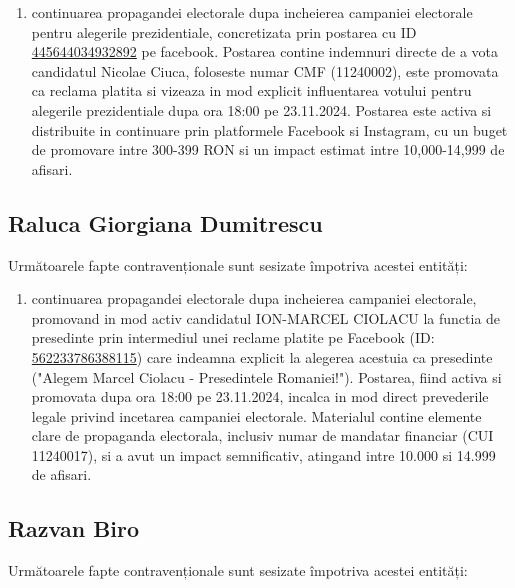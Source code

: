\documentclass[a4paper,12pt]{article}
\begin{document}
\begin{enumerate}[leftmargin=*, label=\arabic*.)]
    \item continuarea propagandei electorale dupa incheierea campaniei electorale pentru alegerile prezidentiale, concretizata prin postarea cu ID \href{https://www.facebook.com/ads/library/?id=445644034932892}{445644034932892} pe facebook. Postarea contine indemnuri directe de a vota candidatul Nicolae Ciuca, foloseste numar CMF (11240002), este promovata ca reclama platita si vizeaza in mod explicit influentarea votului pentru alegerile prezidentiale dupa ora 18:00 pe 23.11.2024. Postarea este activa si distribuite in continuare prin platformele Facebook si Instagram, cu un buget de promovare intre 300-399 RON si un impact estimat intre 10,000-14,999 de afisari.
\end{enumerate}

\vspace{0.5cm}

\subsection{Raluca Giorgiana Dumitrescu}
Următoarele fapte contravenționale sunt sesizate împotriva acestei entități:

\begin{enumerate}[leftmargin=*, label=\arabic*.)]
    \item continuarea propagandei electorale dupa incheierea campaniei electorale, promovand in mod activ candidatul ION-MARCEL CIOLACU la functia de presedinte prin intermediul unei reclame platite pe Facebook (ID: \href{https://www.facebook.com/ads/library/?id=562233786388115}{562233786388115}) care indeamna explicit la alegerea acestuia ca presedinte ("Alegem Marcel Ciolacu - Presedintele Romaniei!"). Postarea, fiind activa si promovata dupa ora 18:00 pe 23.11.2024, incalca in mod direct prevederile legale privind incetarea campaniei electorale. Materialul contine elemente clare de propaganda electorala, inclusiv numar de mandatar financiar (CUI 11240017), si a avut un impact semnificativ, atingand intre 10.000 si 14.999 de afisari.
\end{enumerate}

\vspace{0.5cm}

\subsection{Razvan Biro}
Următoarele fapte contravenționale sunt sesizate împotriva acestei entități:
\end{document}
